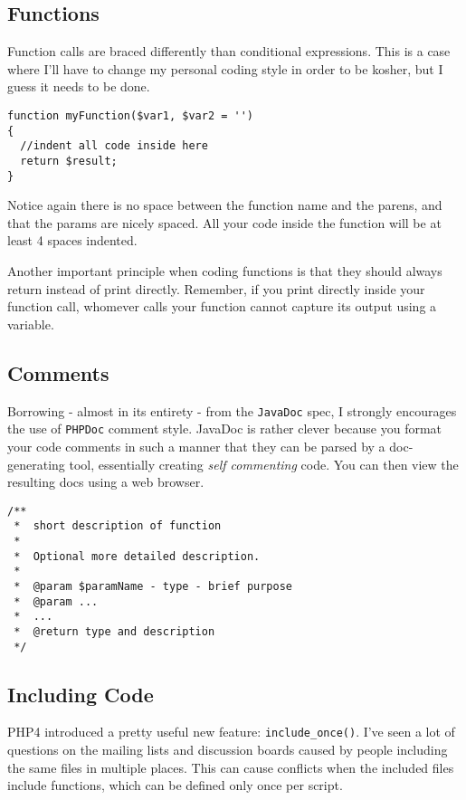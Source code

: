     \subsection{Functions}
        Function calls are braced differently than conditional expressions. This is a case where I'll have
        to change my personal coding style in order to be kosher, but I guess it needs to be done.

\begin{lstlisting}[stepnumber=0,frame={}]
function myFunction($var1, $var2 = '')
{
  //indent all code inside here
  return $result;
}
\end{lstlisting}

        Notice again there is no space between the function name and the parens, and that the params are nicely
        spaced. All your code inside the function will be at least 4 spaces indented.

        Another important principle when coding functions is that they should always return instead of print directly.
        Remember, if you print directly inside your function call, whomever calls your function cannot capture its
        output using a variable.

    \subsection{Comments}
        Borrowing - almost in its entirety - from the \texttt{JavaDoc} spec, I strongly encourages the use of \texttt{PHPDoc} comment style.
        JavaDoc is rather clever because you format your code comments in such a manner that they can be parsed by a
        doc-generating tool, essentially creating \emph{self commenting} code. You can then view the resulting docs using a web browser.

\begin{lstlisting}[stepnumber=0,frame={}]
/**
 *  short description of function
 *
 *  Optional more detailed description.
 *
 *  @param $paramName - type - brief purpose
 *  @param ...
 *  ...
 *  @return type and description
 */
\end{lstlisting}


    \subsection{Including Code}
        PHP4 introduced a pretty useful new feature: \texttt{include\_once()}. I've seen a lot of questions on the mailing
        lists and discussion boards caused by people including the same files in multiple places. This can cause conflicts
        when the included files include functions, which can be defined only once per script.

